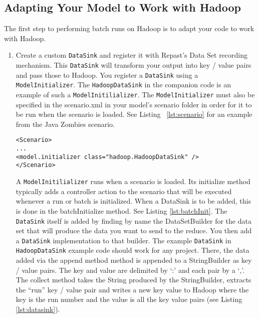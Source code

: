 \documentclass[11pt]{amsart}
\begin{document}
\subsection{Adapting Your Model to Work with Hadoop}
The first step to performing batch runs on Hadoop is to adapt your code to work with Hadoop.
\begin{enumerate}
\item
Create a custom  \texttt{DataSink}  and register it with Repast's Data Set recording mechanism. This \texttt{DataSink} will transform your output into key / value pairs and pass those to Hadoop. You register a  \texttt{DataSink} using a \texttt{ModelInitializer}. The \texttt{HadoopDataSink} in the companion code is an example of such a \texttt{ModelInitilializer}. The \texttt{ModelInitializer} must also be specified in the scenario.xml in your model's scenario folder in order for it to be run when the scenario is loaded. See Listing ~\ref{lst:scenario} for an example from the Java Zombies scenario.

\noindent\begin{minipage}[h]{\textwidth}
\vspace{.2in}
\lstset{language=xml,caption=Specifying the ModelInitializer in scenario.xml,label=lst:scenario}
\begin{lstlisting}
<Scenario>
...
<model.initializer class="hadoop.HadoopDataSink" />
</Scenario>
\end{lstlisting}
\vspace{.2in}
\end{minipage}

A \texttt{ModelInitilializer} runs when a scenario is loaded. Its initialize method typically adds a controller action to the scenario that will be executed whenever a run or batch is initialized. When a DataSink is to be added, this is done in the batchInitialize method. See Listing \ref{lst:batchInit}. The \texttt{DataSink} itself is added by finding by name the DataSetBuilder for the data set that will produce the data you want to send to the reduce. You then add a \texttt{DataSink} implementation to that builder. The example  \texttt{DataSink} in  \texttt{HadoopDataSink} example code should work for any project. There, the data added via the append method method is appended to a StringBuilder as key / value pairs. The key and value are delimited by `:' and each pair by a `,'. The collect method takes the String produced by the StringBuilder, extracts the ``run'' key / value pair and writes a new key value to Hadoop where the key is the run number and the value is all the key value pairs (see Listing \ref{lst:datasink}).


\end{enumerate}
\end{document}
